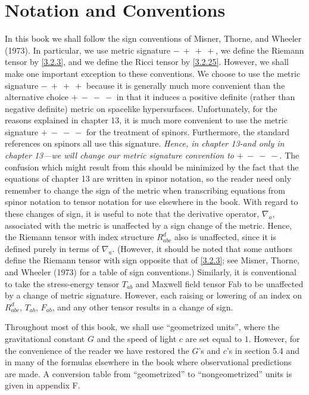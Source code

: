 \chapter*{Notation and Conventions}
In this book we shall follow the sign conventions of Misner, Thorne, and Wheeler (1973). In particular, we use metric signature $-\ +\ +\ +$, we define the Riemann tensor by \eqref{3.2.3}, and we define the Ricci tensor by \eqref{3.2.25}. However, we shall make one important exception to these conventions. We choose to use the metric signature $-\ +\ +\ +$ because it is generally much more convenient than the alternative choice $+\ -\ -\ -$ in that it induces a positive definite (rather than negative definite) metric on spacelike hypersurfaces. Unfortunately, for the reasons explained in chapter 13, it is much more convenient to use the metric signature $+\ -\ -\ -$ for the treatment of spinors. Furthermore, the standard references on spinors all use this signature. \emph{Hence, in chapter 13-and only in chapter 13—we will change our metric signature convention to $+\ -\ -\ -$}. The confusion which might result from this should be minimized by the fact that the equations of chapter 13 are written in spinor notation, so the reader need only remember to change the sign of the metric when transcribing equations from spinor notation to tensor notation for use elsewhere in the book. With regard to these changes of sign, it is useful to note that the derivative operator, $\nabla_a$, associated with the metric is unaffected by a sign change of the metric. Hence, the Riemann tensor with index structure $R_{abc}^d$ also is unaffected, since it is defined purely in terms of $\nabla_a$. (However, it should be noted that some authors define the Riemann tensor with sign opposite that of \eqref{3.2.3}; see Misner, Thorne, and Wheeler (1973) for a table of sign conventions.) Similarly, it is conventional to take the stress-energy tensor $T_{ab}$ and Maxwell field tensor Fab to be unaffected by a change of metric signature. However, each raising or lowering of an index on $R_{abc}^d$, $T_{ab}$, $F_{ab}$, and any other tensor results in a change of sign.

Throughout most of this book, we shall use ``geometrized units'', where the gravitational constant $G$ and the speed of light $c$ are set equal to $1$. However, for the convenience of the reader we have restored the $G$'s and $c$'s in section 5.4 and in many of the formulas elsewhere in the book where observational predictions are made. A conversion table from ``geometrized'' to ``nongeometrized'' units is given in appendix F.

